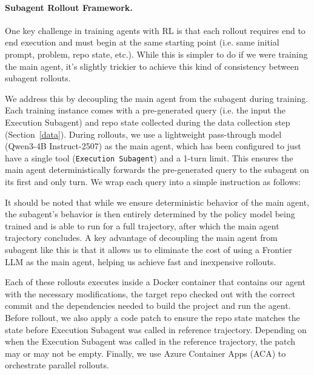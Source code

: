 \documentclass[sigconf,review]{acmart}
\begin{document}
\paragraph{Subagent Rollout Framework.}
One key challenge in training agents with RL is that each rollout requires end to end execution and must begin at the same starting point (i.e. same initial prompt, problem, repo state, etc.). While this is simpler to do if we were training the main agent, it's slightly trickier to achieve this kind of consistency between subagent rollouts.

We address this by decoupling the main agent from the subagent during training. Each training instance comes with a pre-generated query (i.e. the input the Execution Subagent) and repo state collected during the data collection step (Section~\ref{data}). During rollouts, we use a lightweight pass-through model (Qwen3-4B Instruct-2507) as the main agent, which has been configured to just have a single tool (\texttt{Execution Subagent}) and a 1-turn limit. This ensures the main agent deterministically forwards the pre-generated query to the subagent on its first and only turn. We wrap each query into a simple instruction as follows:
\begin{center}
\small
{}
\end{center}

It should be noted that while we ensure deterministic behavior of the main agent, the subagent's behavior is then entirely determined by the policy model being trained and is able to run for a full trajectory, after which the main agent trajectory concludes. A key advantage of decoupling the main agent from subagent like this is that it allows us to eliminate the cost of using a Frontier LLM as the main agent, helping us achieve fast and inexpensive rollouts.

Each of these rollouts executes inside a Docker container that contains our agent with the necessary modifications, the target repo checked out with the correct commit and the dependencies needed to build the project and run the agent. Before rollout, we also apply a code patch to ensure the repo state matches the state before Execution Subagent was called in reference trajectory. Depending on when the Execution Subagent was called in the reference trajectory, the patch may or may not be empty. Finally, we use Azure Container Apps (ACA) to orchestrate parallel rollouts.
\end{document}
